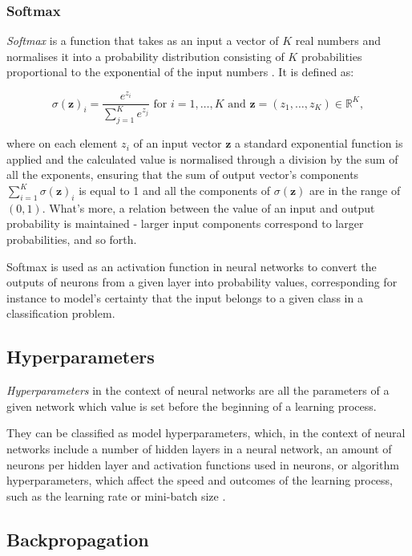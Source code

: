 \subsubsection{Softmax}

\emph{Softmax} is a function that takes as an input a vector of $K$ real numbers and normalises it into a probability distribution consisting of $K$ probabilities proportional to the exponential of the input numbers \cite{wiki:softmax}. It is defined as:

\begin{equation}
\sigma(\mathbf{z})_i = \frac{e^{z_i}}{\sum_{j=1}^K e^{z_j}} \text{ for } i = 1, \dotsc , K \text{ and } \mathbf z=(z_1,\dotsc,z_K) \in\mathbb{R} ^K,
\end{equation}

where on each element $z_i$ of an input vector $\textbf{z}$ a standard exponential function is applied and the calculated value is normalised through a division by the sum of all the exponents, ensuring that the sum of output vector's components $\sum_{i=1}^K\sigma(\mathbf{z})_i$ is equal to 1 and all the components of $\sigma(\mathbf{z})$ are in the range of $(0, 1)$. What's more, a relation between the value of an input and output probability is maintained - larger input components correspond to larger probabilities, and so forth.

Softmax is used as an activation function in neural networks to convert the outputs of neurons from a given layer into probability values, corresponding for instance to model's certainty that the input belongs to a given class in a classification problem.

\subsection{Hyperparameters}

\emph{Hyperparameters} in the context of neural networks are all the parameters of a given network which value is set before the beginning of a learning process.

They can be classified as model hyperparameters, which, in the context of neural networks include a number of hidden layers in a neural network, an amount of neurons per hidden layer and activation functions used in neurons, or algorithm hyperparameters, which affect the speed and outcomes of the learning process, such as the learning rate or mini-batch size \cite{wiki:hyperparams}.

\subsection{Backpropagation}

